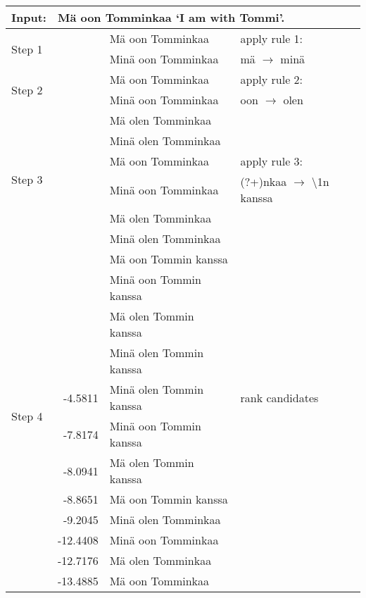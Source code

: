 \documentclass[11pt]{article}
\begin{document}
\begin{table*}
  \centering
  \begin{tabular}{|l|r|l|l|}
    \hline
    \textbf{Input:} & \multicolumn{3}{l|}{M\"{a} oon Tomminkaa `I am with Tommi'.} \\
    \hline
    \multirow{2}{*}{Step 1} & & M\"{a} oon Tomminkaa & apply rule 1: \\
                            & & Min\"{a} oon Tomminkaa & m\"{a} $\rightarrow$ min\"{a} \\
    \hline
    \multirow{2}{*}{Step 2} & & M\"{a} oon Tomminkaa & apply rule 2: \\
                            &   & Min\"{a} oon Tomminkaa & oon $\rightarrow$ olen \\
                            &   & M\"{a} olen Tomminkaa & \\
                            &   & Min\"{a} olen Tomminkaa & \\
    \hline
    \multirow{2}{*}{Step 3} &   & M\"{a} oon Tomminkaa   & apply rule 3:\\
                            &   & Min\"{a} oon Tomminkaa  & (?+)nkaa $\rightarrow$ \textbackslash1n kanssa \\
                            &   & M\"{a} olen Tomminkaa  &\\
                            &   & Min\"{a} olen Tomminkaa  &\\
                            &   & M\"{a} oon Tommin kanssa  &\\
                            &   & Min\"{a} oon Tommin kanssa  &\\
                            &   & M\"{a} olen Tommin kanssa  &\\
                            &   & Min\"{a} olen Tommin kanssa  &\\
    \hline
    \multirow{2}{*}{Step 4} & -4.5811 &  Min\"{a} olen Tommin kanssa & rank candidates \\
                            & -7.8174 &  Min\"{a} oon Tommin kanssa & \\
                            & -8.0941 &  M\"{a} olen Tommin kanssa & \\
                            & -8.8651&  M\"{a} oon Tommin kanssa & \\
                            & -9.2045 &  Min\"{a} olen Tomminkaa & \\
                            & -12.4408 &  Min\"{a} oon Tomminkaa & \\
                            & -12.7176 &  M\"{a} olen Tomminkaa & \\
                            & -13.4885 &  M\"{a} oon Tomminkaa & \\


\end{tabular}
\end{table*}
\end{document}
